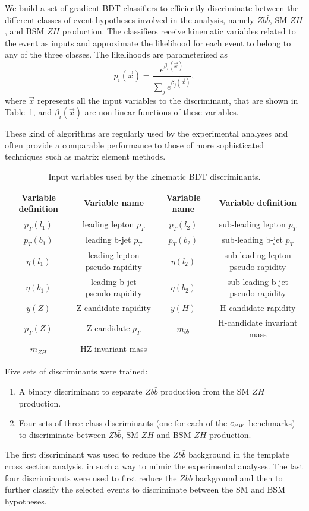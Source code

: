 We build a set of gradient BDT classifiers to efficiently discriminate
between the different classes of event hypotheses involved in the analysis, namely $Z b\bar{b}$,
SM $Z H$, and BSM $Z H$ production. 
The classifiers receive kinematic variables related to the event as inputs and approximate
the likelihood for each event to belong to any of the three classes. The likelihoods are parameterised as
%
\begin{equation}
p_{i}(\vec x) = \frac{ e^{\beta_{i}(\vec x) } }{ \sum_j e^{\beta_{j}(\vec x) } },
\end{equation}
%
where $\vec x$ represents all the input variables to the discriminant, that are shown in
Table~\ref{tab:bdt_features}, and $\beta_{i}(\vec x)$ are non-linear functions of these
variables.

These kind of algorithms are regularly used by the experimental analyses and often provide a comparable performance to those of more sophisticated techniques such as matrix element methods. 
%
\begin{table}[h!]
\centering
\begin{tabular}{|c|c|c|c|}
\hline
Variable definition & Variable name &  Variable name & Variable definition \\
\hline
$p_T(l_1)$ & leading lepton $p_T$ & $p_T(l_2)$ & sub-leading lepton $p_T$\\
$p_T(b_1)$ & leading b-jet $p_T$ & $p_T(b_2)$ & sub-leading b-jet $p_T$\\
$\eta(l_1)$ & leading lepton pseudo-rapidity & $\eta(l_2)$ & sub-leading lepton pseudo-rapidity\\
$\eta(b_1)$ & leading b-jet pseudo-rapidity  & $\eta(b_2)$ & sub-leading b-jet  pseudo-rapidity\\
$y(Z)$ & Z-candidate rapidity  & $y(H)$ & H-candidate rapidity \\
$p_T(Z)$ & Z-candidate $p_T$  & $m_{bb}$ & H-candidate invariant mass \\
$m_{ZH}$ & HZ invariant mass  &  &  \\
\hline
\end{tabular}
\caption{
\label{tab:bdt_features}
Input variables used by the kinematic BDT discriminants.
}
\end{table}

Five sets of discriminants were trained:
\begin{enumerate}
\item A binary discriminant to separate $Z b\bar{b}$ production from the SM $Z H$ production.
\item Four sets of three-class discriminants (one for each of the $c_{\scriptscriptstyle HW}$ benchmarks) to
    discriminate between $Z b\bar{b}$, SM $Z H$ and BSM $Z H$ production.
\end{enumerate}
The first discriminant was used to reduce the $Z b\bar{b}$ background in the template
cross section analysis, in such a way to mimic the experimental analyses.
The last four discriminants were used to first reduce the $Z b\bar{b}$ background and then to further classify the selected events to discriminate between the SM and BSM hypotheses.

